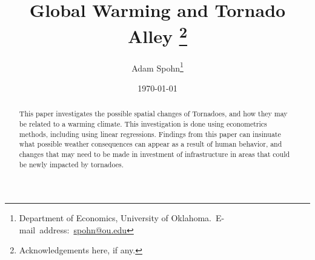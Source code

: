 \documentclass[12pt,english]{article}
\begin{document}
\begin{singlespace}
\title{Global Warming and Tornado Alley
\thanks{Acknowledgements here, if any.}}
\end{singlespace}

\author{Adam Spohn\thanks{Department of Economics, University of Oklahoma.\
E-mail~address:~\href{mailto:spohn@ou.edu}{spohn@ou.edu}}}

\date{\today}

\maketitle

\begin{abstract}
\begin{singlespace}
This paper investigates the possible spatial changes of Tornadoes, and how they may be related to a warming climate. This investigation is done using econometrics methods, including using linear regressions. Findings from this paper can insinuate what possible weather consequences can appear as a result of human behavior, and changes that may need to be made in investment of infrastructure in areas that could be newly impacted by tornadoes.
\end{singlespace}

\end{abstract}
\vfill{}


\pagebreak{}
\end{document}
